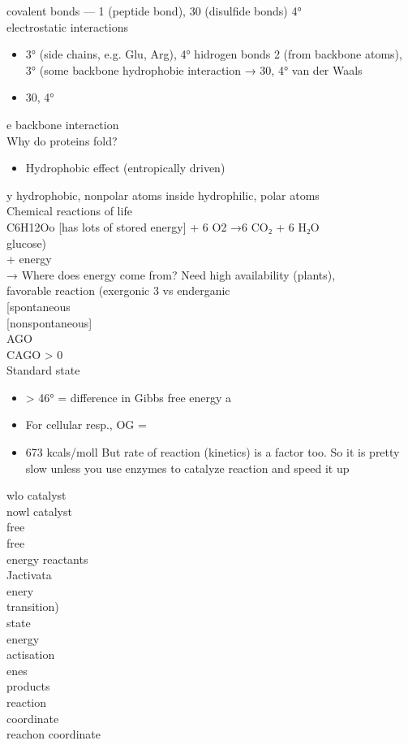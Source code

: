 \documentclass{article}
\begin{document}
covalent bonds — 1 (peptide bond), 30 (disulfide bonds) 4°\\
electrostatic interactions \begin{itemize}\item 3° (side chains, e.g. Glu, Arg), 4°
hidrogen bonds 2 (from backbone atoms), 3° (some backbone
hydrophobie interaction → 30, 4°
van der Waals \item  30, 4°
\end{itemize}
e backbone interaction\\
Why do proteins fold?\\
\begin{itemize}\item  Hydrophobic effect (entropically driven)
\end{itemize}
y hydrophobic, nonpolar atoms inside hydrophilic, polar atoms\\
Chemical reactions of life\\
C6H12Oo {[}has lots of stored energy{]} + 6 O2 →6 CO₂ + 6 H₂O\\
glucose)\\
+ energy\\
→ Where does energy come from? Need high availability (plants),\\
favorable reaction (exergonic 3 vs enderganic\\
{[}spontaneous\\
{[}nonspontaneous{]}\\
AGO\\
CAGO > 0\\
Standard state\\
\begin{itemize}\item > 46° = difference in Gibbs free energy a
\item  For cellular resp., OG = \item 673 kcals/moll
But rate of reaction (kinetics) is a factor too. So it is pretty
slow unless you use enzymes to catalyze reaction and speed it up
\end{itemize}
wlo catalyst\\
nowl catalyst\\
free\\
free\\
energy reactants\\
Jactivata\\
enery\\
transition)\\
state\\
energy\\
actisation\\
enes\\
products\\
reaction\\
coordinate\\
reachon coordinate\\
\end{document}

